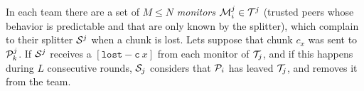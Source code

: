 In each team there are a set of $M\leq N$ \emph{monitors} ${\cal
M}^j_i\in {\cal T}^j$ (trusted peers whose behavior is predictable and
that are only known by the splitter), which complain to their splitter
${\cal S}^j$ when a chunk is lost. Lets suppose that chunk $c_x$ was
sent to ${\cal P}^j_k$. If ${\cal S}^j$ receives a
$[\mathtt{lost-c}~x]$ from each monitor of ${\cal T}_j$, and if
this happens during $L$ consecutive rounds, ${\cal S}_j$ considers
that ${\cal P}_i$ has leaved ${\cal T}_j$, and removes it from the
team.

